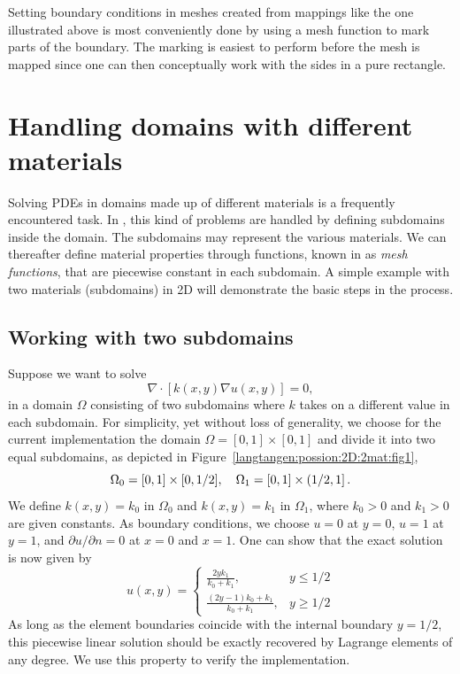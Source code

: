 Setting boundary conditions in meshes created from mappings like the one
illustrated above is most conveniently done by using a mesh function
to mark parts of the boundary. The marking is easiest to perform
before the mesh is mapped since one can then conceptually work with
the sides in a pure rectangle.

\section{Handling domains with different materials}

Solving PDEs in domains made up of different materials is a frequently
encountered task. In \fenics, this kind of problems are handled by
defining subdomains inside the domain. The subdomains may represent the
various materials. We can thereafter define material properties through
functions, known in \fenics{} as \emph{mesh functions},
that are piecewise constant in each subdomain.
A simple example with
two materials (subdomains) in 2D will
demonstrate the basic steps in the process.

\subsection{Working with two subdomains}
\label{langtangen:possion:2D:2mat:problem}

Suppose we want to solve
\begin{equation} \label{langtangen:poisson:2D:2mat:varcoeff2}
    \nabla\cdot \left\lbrack k(x,y)\nabla u(x,y)\right\rbrack = 0,
\end{equation}
in a domain $\Omega$ consisting of two subdomains where $k$ takes on
a different value in each subdomain.
For simplicity, yet without loss of generality, we choose for the current
implementation
the domain $\Omega = [0,1]\times [0,1]$ and divide it into two equal
subdomains, as depicted in Figure~\ref{langtangen:possion:2D:2mat:fig1},
\[ \Omega_0 = [0, 1]\times [0,1/2],\quad
\Omega_1 = [0, 1]\times (1/2,1]\thinspace .\]
We define $k(x,y)=k_0$ in $\Omega_0$ and $k(x,y)=k_1$ in $\Omega_1$,
where $k_0>0$ and $k_1>0$ are given constants.
As boundary conditions, we choose $u=0$ at $y=0$, $u=1$ at $y=1$,
and $\partial u/\partial n=0$ at $x=0$ and $x=1$.
One can show that the exact solution is now given by
\begin{equation}
u(x, y) = \left\lbrace\begin{array}{ll}
\frac{2yk_1}{k_0+k_1}, & y \leqslant 1/2\\
\frac{(2y-1)k_0 + k_1}{k_0+k_1}, & y \geqslant 1/2
\end{array}\right.
\end{equation}
As long as the element boundaries coincide with the internal boundary
$y=1/2$, this piecewise linear solution should be exactly recovered
by Lagrange elements of any degree. We use this property to verify
the implementation.

